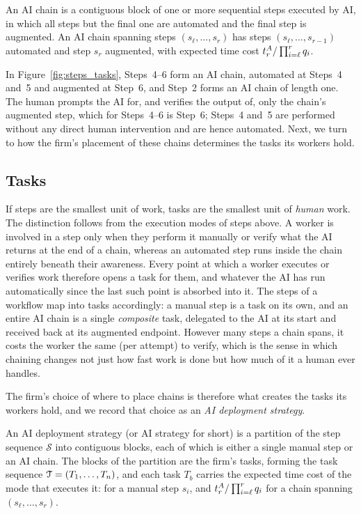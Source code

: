 \begin{definition}[AI Chain]
\label{def:ai_chain}
An AI chain is a contiguous block of one or more sequential steps executed by AI, in which all steps but the final one are automated and the final step is augmented.
An AI chain spanning steps $(s_\ell,\dots,s_r)$ has steps $(s_\ell,\dots,s_{r-1})$ automated and step $s_r$ augmented, with expected time cost $t^{A}_{r}/\prod_{i=\ell}^{r} q_i$.
\end{definition}
In Figure~\ref{fig:steps_tasks}, Steps~4--6 form an AI chain, automated at Steps~4 and~5 and augmented at Step~6, and Step~2 forms an AI chain of length one. The human prompts the AI for, and verifies the output of, only the chain's augmented step, which for Steps~4--6 is Step~6; Steps~4 and~5 are performed without any direct human intervention and are hence automated.
Next, we turn to how the firm's placement of these chains determines the tasks its workers hold.



\subsection{Tasks}
\label{sec:model.tasks}

If steps are the smallest unit of work, tasks are the smallest unit of \emph{human} work.
The distinction follows from the execution modes of steps above. 
A worker is involved in a step only when they perform it manually or verify what the AI returns at the end of a chain, whereas an automated step runs inside the chain entirely beneath their awareness.
Every point at which a worker executes or verifies work therefore opens a task for them, and whatever the AI has run automatically since the last such point is absorbed into it.
The steps of a workflow map into tasks accordingly: a manual step is a task on its own, and an entire AI chain is a single \emph{composite} task, delegated to the AI at its start and received back at its augmented endpoint.
However many steps a chain spans, it costs the worker the same (per attempt) to verify, which is the sense in which chaining changes not just how fast work is done but how much of it a human ever handles.

The firm's choice of where to place chains is therefore what creates the tasks its workers hold, and we record that choice as an \emph{AI deployment strategy}.

\begin{definition}
\label{def:ai_strategy}
An AI deployment strategy (or AI strategy for short) is a partition of the step sequence $\mathcal{S}$ into contiguous blocks, each of which is either a single manual step or an AI chain.
The blocks of the partition are the firm's tasks, forming the task sequence $\mathcal{T} = (T_1, \dotsc, T_n)$, and each task $T_b$ carries the expected time cost  of the mode that executes it:  for a manual step $s_i$, and $t^{A}_{r}/\prod_{i=\ell}^{r} q_i$ for a chain spanning $(s_\ell, \dotsc, s_r)$.
\end{definition}

